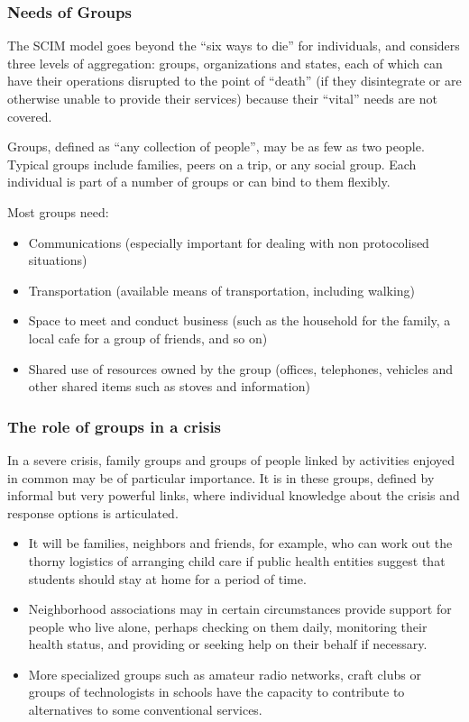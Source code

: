 \documentclass[12pt, a4]{scrartcl}
\begin{document}
\subsubsection{Needs of Groups}
The SCIM model goes beyond the “six ways to die” for individuals, and considers three levels of aggregation: groups, organizations and states, each of which can have their operations disrupted to the point of “death” (if they disintegrate or are otherwise unable to provide their services) because their “vital” needs are not covered.

Groups, defined as “any collection of people”, may be as few as two people. Typical groups include families, peers on a trip, or any social group. Each individual is part of a number of groups or can bind to them flexibly. 

Most groups need:
\begin{itemize}
	\item Communications (especially important for dealing with non protocolised situations)
	\item Transportation (available means of transportation, including walking)
	\item Space to meet and conduct business (such as the household for the family, a local cafe for a group of friends, and so on)
	\item Shared use of resources owned by the group (offices, telephones, vehicles and other shared items such as stoves and information)
\end{itemize}

\subsubsection{The role of groups in a crisis}
In a severe crisis, family groups and groups of people linked by activities enjoyed in common may be of particular importance. It is in these groups, defined by informal but very powerful links, where individual knowledge about the crisis and response options is articulated.

\begin{itemize}
	\item It will be families, neighbors and friends, for example, who can work out the thorny logistics of arranging child care if public health entities suggest that students should stay at home for a period of time.
	\item Neighborhood associations may in certain circumstances provide support for people who live alone, perhaps checking on them daily, monitoring their health status, and providing or seeking help on their behalf if necessary.
	\item More specialized groups such as amateur radio networks, craft clubs or groups of technologists in schools have the capacity to contribute to alternatives to some conventional services.
\end{itemize}
\end{document}
